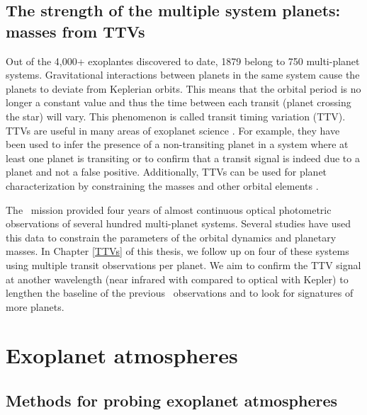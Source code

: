 
\subsection{The strength of the multiple system planets: masses from TTVs}%

Out of the 4,000+ exoplantes discovered to date, 1879 belong to 750 multi-planet systems. Gravitational interactions between planets in the same system cause the planets to deviate from Keplerian orbits. This means that the orbital period is no longer a constant value and thus the time between each transit (planet crossing the star) will vary. This phenomenon is called transit timing variation (TTV). TTVs are useful in many areas of exoplanet science \citep[e.g.,][]{Schneider2003, Agol2005, Holman2005}. For example, they have been used to infer the presence of a non-transiting planet in a system where at least one planet is transiting or to confirm that a transit signal is indeed due to a planet and not a false positive. Additionally, TTVs can be used for planet characterization by constraining the masses and other orbital elements \citep[e.g.,][]{Ballard2011, Holman2010, Carter2012}.

 The \Kepler~mission provided four years of almost continuous optical photometric observations of several hundred multi-planet systems. Several studies have used this data to constrain the parameters of the orbital dynamics and planetary masses. In Chapter \ref{TTVs} of this thesis, we follow up on four of these systems using multiple transit observations per planet. We aim to confirm the TTV signal at another wavelength (near infrared with \spitzerIRAC compared to optical with Kepler) to lengthen the baseline of the previous \Kepler~observations and to look for signatures of more planets.

\section{Exoplanet atmospheres}
\subsection{Methods for probing exoplanet atmospheres}%

